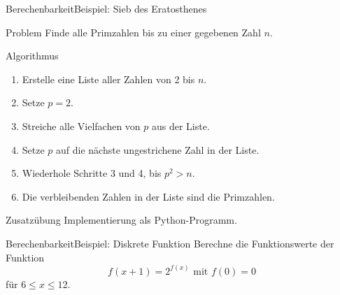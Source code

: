 \documentclass[xelatex,aspectratio=169]{beamer}
\begin{document}
\begin{frame}{Berechenbarkeit}{Beispiel: Sieb des Eratosthenes}
  \begin{block}{Problem}
    Finde alle Primzahlen bis zu einer gegebenen Zahl $n$.
  \end{block}

  \begin{block}{Algorithmus}
    \begin{enumerate}
      \item Erstelle eine Liste aller Zahlen von 2 bis $n$.
      \item Setze $p = 2$.
      \item Streiche alle Vielfachen von $p$ aus der Liste.
      \item Setze $p$ auf die nächste ungestrichene Zahl in der Liste.
      \item Wiederhole Schritte 3 und 4, bis $p^2 > n$.
      \item Die verbleibenden Zahlen in der Liste sind die Primzahlen.
    \end{enumerate}
  \end{block}

  \begin{exampleblock}{Zusatzübung}
    Implementierung als Python-Programm.
  \end{exampleblock}
\end{frame}

\begin{frame}{Berechenbarkeit}{Beispiel: Diskrete Funktion}
  Berechne die Funktionswerte der Funktion
  \[
    f\left(x+1\right) = 2 ^ {f\left(x\right)} \mbox{ mit } f\left(0\right) = 0
  \]
  für \( 6 \leq x \leq 12 \).



\end{frame}
\end{document}
